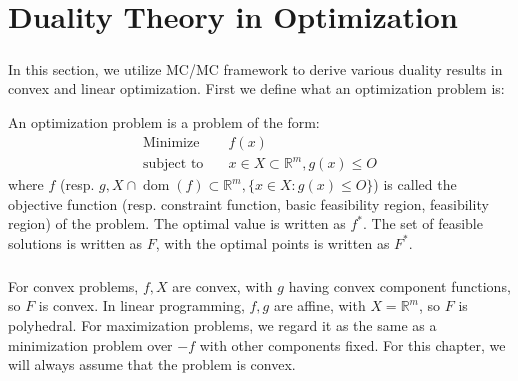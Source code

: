 \chapter{Duality Theory in Optimization}
\label{chap:04}

\paragraph{}In this section, we utilize MC/MC framework to derive various duality results in convex and linear optimization. First we define what an optimization problem is:

\begin{defn}\label{defn:040-opt-prob}
	An optimization problem is a problem of the form:
	\begin{align*}
		\text{Minimize}\quad   & f(x)                                   \\
		\text{subject to}\quad & x\in X\subset \mathbb{R}^m, g(x)\leq O
	\end{align*}
	where $f$ (resp. $g,X\cap \operatorname{dom}(f)\subset \mathbb{R}^m,\{x\in X:g(x)\leq O\}$) is called the objective function (resp. constraint function, basic feasibility region, feasibility region) of the problem. The optimal value is written as $f^\ast$. The set of feasible solutions is written as $F$, with the optimal points is written as $F^\ast$.
\end{defn}

\paragraph{}For convex problems, $f,X$ are convex, with $g$ having convex component functions, so $F$ is convex. In linear programming, $f,g$ are affine, with $X=\mathbb{R}^m$, so $F$ is polyhedral. For maximization problems, we regard it as the same as a minimization problem over $-f$ with other components fixed. For this chapter, we will always assume that the problem is convex.






